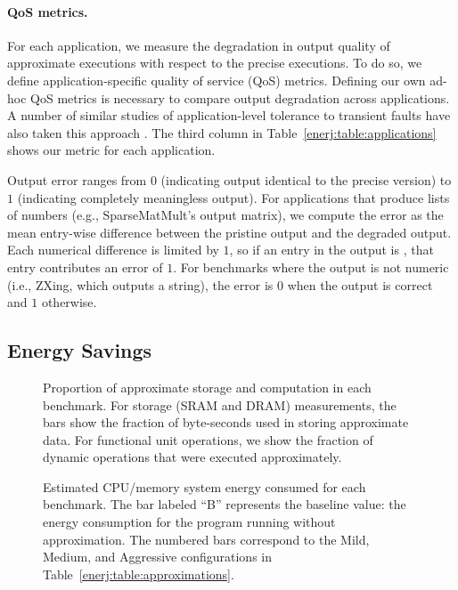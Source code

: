\paragraph{QoS metrics.} For each application, we measure the
degradation in output quality of approximate executions with respect
to the precise executions. To do so, we define application-specific
quality of service (QoS) metrics. Defining our own ad-hoc QoS metrics
is necessary to compare output degradation across applications.
A number of similar studies of
application-level tolerance to transient faults have also taken this
approach \cite{qosprof, green, dekruijf-selse09, ersa, wong-selse06,
  softcomputing}. The third column in
Table~\ref{enerj:table:applications} shows our metric for each application.

Output error ranges from $0$ (indicating output identical to the
precise version) to $1$ (indicating completely meaningless output). For
applications that produce lists of numbers (e.g., SparseMatMult's output
matrix), we compute the error as the mean entry-wise difference between the
pristine output and the degraded output. Each numerical difference is limited
by $1$, so if an entry in the output is ,
that entry contributes an error of $1$. For benchmarks where the output is not
numeric (i.e., ZXing, which outputs a string), the error is $0$ when the output
is correct and $1$ otherwise. %


\subsection{Energy Savings}

\begin{figure}

\vspace{-4ex} %
\caption{Proportion of approximate storage and computation in each benchmark.
For storage (SRAM and DRAM) measurements, the bars
show the fraction of byte-seconds used in storing approximate data.
For functional unit operations, we show the fraction of dynamic operations
that were executed approximately.}
\label{enerj:fig:approximateness}
\end{figure}

\begin{figure}

\vspace{-4ex} %
\caption{Estimated CPU/memory system energy consumed for
each benchmark. The bar labeled ``B'' represents the baseline value:
the energy consumption for the program running without approximation.
The numbered bars correspond to the Mild, Medium, and Aggressive
configurations in Table~\ref{enerj:table:approximations}.}
\label{enerj:fig:energy}
\end{figure}

